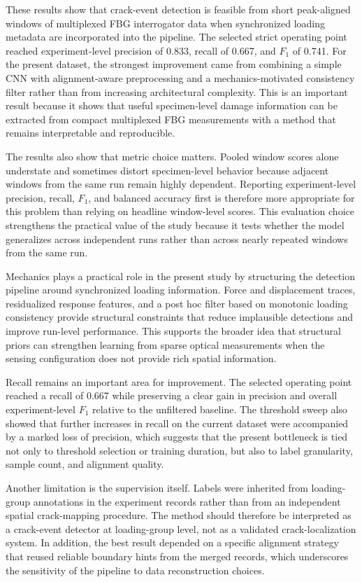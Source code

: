 \documentclass[fleqn,10pt]{wlscirep}
\begin{document}
These results show that crack-event detection is feasible from short peak-aligned windows of multiplexed FBG interrogator data when synchronized loading metadata are incorporated into the pipeline. The selected strict operating point reached experiment-level precision of 0.833, recall of 0.667, and $F_1$ of 0.741. For the present dataset, the strongest improvement came from combining a simple CNN with alignment-aware preprocessing and a mechanics-motivated consistency filter rather than from increasing architectural complexity. This is an important result because it shows that useful specimen-level damage information can be extracted from compact multiplexed FBG measurements with a method that remains interpretable and reproducible.

The results also show that metric choice matters. Pooled window scores alone understate and sometimes distort specimen-level behavior because adjacent windows from the same run remain highly dependent. Reporting experiment-level precision, recall, $F_1$, and balanced accuracy first is therefore more appropriate for this problem than relying on headline window-level scores. This evaluation choice strengthens the practical value of the study because it tests whether the model generalizes across independent runs rather than across nearly repeated windows from the same run.

Mechanics plays a practical role in the present study by structuring the detection pipeline around synchronized loading information. Force and displacement traces, residualized response features, and a post hoc filter based on monotonic loading consistency provide structural constraints that reduce implausible detections and improve run-level performance. This supports the broader idea that structural priors can strengthen learning from sparse optical measurements when the sensing configuration does not provide rich spatial information.

Recall remains an important area for improvement. The selected operating point reached a recall of 0.667 while preserving a clear gain in precision and overall experiment-level $F_1$ relative to the unfiltered baseline. The threshold sweep also showed that further increases in recall on the current dataset were accompanied by a marked loss of precision, which suggests that the present bottleneck is tied not only to threshold selection or training duration, but also to label granularity, sample count, and alignment quality.

Another limitation is the supervision itself. Labels were inherited from loading-group annotations in the experiment records rather than from an independent spatial crack-mapping procedure. The method should therefore be interpreted as a crack-event detector at loading-group level, not as a validated crack-localization system. In addition, the best result depended on a specific alignment strategy that reused reliable boundary hints from the merged records, which underscores the sensitivity of the pipeline to data reconstruction choices.
\end{document}
